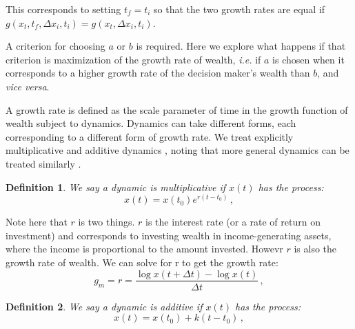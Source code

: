 \documentclass[11pt]{article}
\newtheorem{definition}{Definition}
\newcommand{\ie}{{\it i.e.}\xspace}
\newcommand{\be}{\begin{equation}}
\newcommand{\ee}{\end{equation}}
\newcommand{\Dt}{\Delta t}
\newcommand{\Dx}{\Delta x}
\numberwithin{equation}{section}
\begin{document}
This corresponds to setting $t_f=t_i$ so that the two growth rates are equal if $g(x_t,t_f,\Delta x_i, t_i)=g(x_t,\Delta x_i, t_i)$.


A criterion for choosing $a$ or $b$ is required. Here we explore what happens if that criterion is maximization of the growth rate of wealth, \ie if $a$ is chosen when it corresponds to a higher growth rate of the decision maker's wealth than $b$, and \textit{vice versa}.

A growth rate is defined as the scale parameter of time in the growth function of wealth subject to dynamics. Dynamics can take different forms, each corresponding to a different form of growth rate. We treat explicitly multiplicative and additive dynamics \citep{PetersGell-Mann2016}, noting that more general dynamics can be treated similarly \citep{PetersAdamou2018a}.

\begin{definition}
We say a dynamic is \textit{multiplicative} if $x\left(t\right)$ has the process: 
\be
x\left(t\right) = x\left(t_0\right) e^{r \left(t - t_0\right)}\,,
\ee
\end{definition}
Note here that $r$ is two things. $r$ is the interest rate (or a rate of return on investment) and corresponds to investing wealth in income-generating assets, where the income is proportional to the amount invested. Howevr $r$ is also the growth rate of wealth. We can solve for r to get the growth rate: 
\be
g_m=r = \frac{\log x\left(t+\Dt\right)-\log x\left(t\right)}{\Dt}\,,
\ee

\begin{definition}
We say a dynamic is \textit{additive} if $x\left(t\right)$ has the process: 
\be
x\left(t\right) = x\left(t_0\right) + k \left(t - t_0\right)\,,
\ee
\end{definition}
\end{document}
